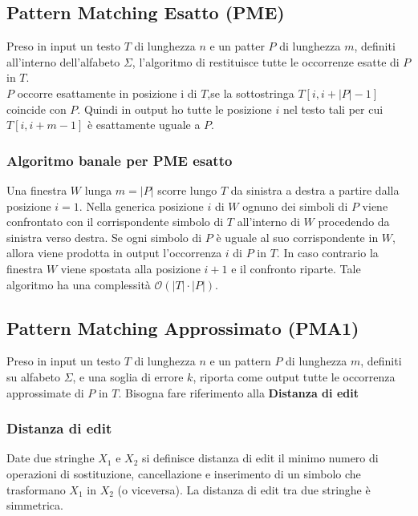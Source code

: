 \subsection{Pattern Matching Esatto (PME)}
Preso in input un testo $T$ di lunghezza $n$ e un patter $P$ di lunghezza $m$, definiti all'interno dell'alfabeto $\Sigma$, l'algoritmo di restituisce tutte le occorrenze esatte di $P$ in $T$.\\ 
$P$ occorre esattamente in posizione i di $T$,se la sottostringa $T[i, i+|P|-1]$  coincide con  $P$. Quindi in output ho tutte le posizione $i$ nel testo tali per cui $T[i,i+m-1]$ è esattamente uguale a $P$.

\subsubsection{Algoritmo banale per PME esatto}
Una finestra $W$ lunga $m = |P|$ scorre lungo $T$ da sinistra a destra a partire dalla posizione $i = 1$. Nella generica posizione $i$ di $W$ ognuno dei simboli di $P$ viene confrontato con il corrispondente simbolo di $T$ all'interno di $W$ procedendo da sinistra verso destra. Se ogni simbolo di $P$ è uguale al suo corrispondente in $W$, allora viene prodotta in output l'occorrenza $i$ di $P$ in $T$. In caso contrario la finestra $W$ viene spostata alla posizione $i+1$ e il confronto riparte. Tale algoritmo ha una complessità $\mathcal{O}(|T| \cdot |P|)$.


\subsection{Pattern Matching Approssimato (PMA1)}
Preso in input un testo $T$ di lunghezza $n$ e un pattern $P$ di lunghezza $m$, definiti su alfabeto $\Sigma$, e una soglia di errore $k$, riporta come output tutte le occorrenza approssimate di $P$ in $T$. 
Bisogna fare riferimento alla \textbf{Distanza di edit}
\subsubsection{Distanza di edit}
Date due stringhe $X_1$ e $X_2$ si definisce distanza di edit il minimo numero di operazioni di sostituzione, cancellazione e inserimento di un simbolo che trasformano $X_1$ in $X_2$ (o viceversa). La distanza di edit tra due stringhe è simmetrica.
